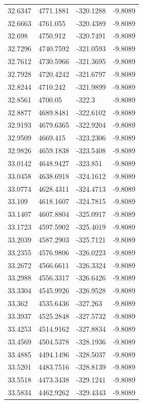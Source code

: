 \begin{table}[H]
\begin{tabular}{llll}
32.6347 & 4771.1881 & -320.1288 & -9.8089 \\
32.6663 & 4761.055 & -320.4389 & -9.8089 \\
32.698 & 4750.912 & -320.7491 & -9.8089 \\
32.7296 & 4740.7592 & -321.0593 & -9.8089 \\
32.7612 & 4730.5966 & -321.3695 & -9.8089 \\
32.7928 & 4720.4242 & -321.6797 & -9.8089 \\
32.8244 & 4710.242 & -321.9899 & -9.8089 \\
32.8561 & 4700.05 & -322.3 & -9.8089 \\
32.8877 & 4689.8481 & -322.6102 & -9.8089 \\
32.9193 & 4679.6365 & -322.9204 & -9.8089 \\
32.9509 & 4669.415 & -323.2306 & -9.8089 \\
32.9826 & 4659.1838 & -323.5408 & -9.8089 \\
33.0142 & 4648.9427 & -323.851 & -9.8089 \\
33.0458 & 4638.6918 & -324.1612 & -9.8089 \\
33.0774 & 4628.4311 & -324.4713 & -9.8089 \\
33.109 & 4618.1607 & -324.7815 & -9.8089 \\
33.1407 & 4607.8804 & -325.0917 & -9.8089 \\
33.1723 & 4597.5902 & -325.4019 & -9.8089 \\
33.2039 & 4587.2903 & -325.7121 & -9.8089 \\
33.2355 & 4576.9806 & -326.0223 & -9.8089 \\
33.2672 & 4566.6611 & -326.3324 & -9.8089 \\
33.2988 & 4556.3317 & -326.6426 & -9.8089 \\
33.3304 & 4545.9926 & -326.9528 & -9.8089 \\
33.362 & 4535.6436 & -327.263 & -9.8089 \\
33.3937 & 4525.2848 & -327.5732 & -9.8089 \\
33.4253 & 4514.9162 & -327.8834 & -9.8089 \\
33.4569 & 4504.5378 & -328.1936 & -9.8089 \\
33.4885 & 4494.1496 & -328.5037 & -9.8089 \\
33.5201 & 4483.7516 & -328.8139 & -9.8089 \\
33.5518 & 4473.3438 & -329.1241 & -9.8089 \\
33.5834 & 4462.9262 & -329.4343 & -9.8089 \\

\end{tabular}
\end{table}
